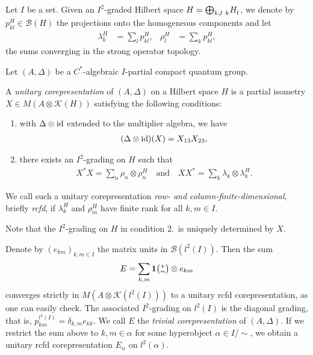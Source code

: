 Let $I$ be a set. Given an $I^{2}$-graded Hilbert space
$H=\bigoplus_{k,l} \Grd{H}{k}{l}$, we denote by
$p_{kl}^{H} \in \mathcal{B}(H)$ the projections onto the homogeneous components and let
\begin{align*}
  \lambda^{H}_{k} &= \sum_{l} p_{kl}^{H}, &
  \rho^{H}_{l} &= \sum_{k} p_{kl}^{H},
\end{align*}
 the sums converging in the strong operator topology.


 \begin{Def} \label{def:corepresentation} Let $(A,\Delta)$ be a
   $C^{*}$-algebraic $I$-partial compact quantum group. 

   A \emph{unitary corepresentation} of $(A,\Delta)$ on a Hilbert
   space $H$ is a partial isometry $X \in M(A \otimes \mathcal{K}(H))$
   satisfying the following conditions:
   \begin{enumerate}
   \item with $\Delta \otimes \operatorname{id}$ extended to the multiplier algebra, we have
     \begin{align} \label{eq:corep}
     (\Delta \otimes \operatorname{id})(X) = X_{13}X_{23},  
   \end{align}
 \item there exists an $I^{2}$-grading on $H$ such that
     \begin{align} \label{eq:corep-pi}
       X^{*}X= \sum_{n}\rho_{n} \otimes \rho^{H}_{n} \quad \text{and}
       \quad XX^{*} = \sum_{k} \lambda_{k} \otimes \lambda^{H}_{k}.
     \end{align}
   \end{enumerate}
   We call such a unitary corepresentation \emph{row- and column-finite-dimensional}, briefly
   \emph{rcfd}, if $\lambda^{H}_{k}$ and $\rho^{H}_{m}$ have finite rank for all $k,m\in I$.
\end{Def}
Note that the $I^{2}$-grading on $H$ in  condition 2.\ is uniquely
determined by $X$.

\begin{Exa} \label{exa:corep-trivial}
  Denote by $(e_{km})_{k,m\in I}$ the matrix units in $\mathcal{B}(l^{2}(I))$. Then the sum
  \begin{align*}
    E = \sum_{k,m} \mathbf{1}{\tiny {\begin{pmatrix} k\\m\end{pmatrix}}} \otimes e_{km} 
  \end{align*}
  converges strictly in $M(A\otimes \mathcal{K}(l^{2}(I)))$ to a unitary rcfd corepresentation, as
  one can easily check. The associated $I^{2}$-grading on $l^{2}(I)$ is the diagonal grading, that
  is, $p^{l^{2}(I)}_{km} =\delta_{k,m} e_{kk}$. We call $E$ the \emph{trivial corepresentation} of
  $(A,\Delta)$. 
If we restrict the sum above to $k,m \in \alpha$ for some hyperobject $\alpha \in I/\sim$, we obtain a unitary rcfd corepresentation $E_{\alpha}$ on $l^{2}(\alpha)$.
\end{Exa}

